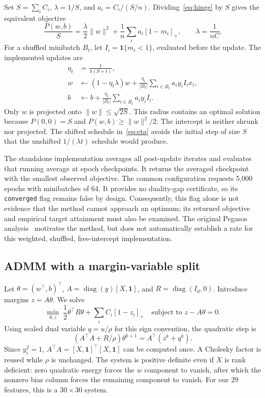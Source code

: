 \documentclass{article}
\newcommand{\hinge}[1]{\left[#1\right]_{+}}
\newcommand{\ind}{\mathbf{1}}
\begin{document}
Set $S=\sum_iC_i$, $\lambda=1/S$, and $a_i=C_i/(S/n)$. Dividing~\eqref{eq:hinge} by $S$ gives the equivalent objective
\begin{equation}
 \frac{P(w,b)}{S}=\frac{\lambda}{2}\lVert w\rVert^2+
 \frac1n\sum_i a_i\hinge{1-m_i},\qquad \lambda=\frac1{nC}.
 \label{eq:pegasos-form}
\end{equation}
For a shuffled minibatch $B_t$, let $I_i=\ind\{m_i<1\}$, evaluated before the update. The implemented updates are
\begin{align}
 \eta_t&=\frac{1}{\lambda(S+t)},\label{eq:eta}\\
 w&\leftarrow(1-\eta_t\lambda)w+
       \frac{\eta_t}{|B_t|}\sum_{i\in B_t} a_i y_i I_i x_i,\\
 b&\leftarrow b+\frac{\eta_t}{|B_t|}\sum_{i\in B_t}a_i y_i I_i.
\end{align}
Only $w$ is projected onto $\lVert w\rVert\leq\sqrt{2S}$. This radius contains an optimal solution because $P(0,0)=S$ and $P(w,b)\geq\lVert w\rVert^2/2$. The intercept is neither shrunk nor projected. The shifted schedule in~\eqref{eq:eta} avoids the initial step of size $S$ that the unshifted $1/(\lambda t)$ schedule would produce.

The standalone implementation averages all post-update iterates and evaluates that running average at epoch checkpoints. It returns the averaged checkpoint with the smallest observed objective. The common configuration requests 5,000 epochs with minibatches of 64. It provides no duality-gap certificate, so its \texttt{converged} flag remains false by design. Consequently, this flag alone is not evidence that the method cannot approach an optimum; its returned objective and empirical target attainment must also be examined. The original Pegasos analysis~\citep{shalev2011} motivates the method, but does not automatically establish a rate for this weighted, shuffled, free-intercept implementation.

\subsection{ADMM with a margin-variable split}

Let $\theta=(w^\top,b)^\top$, $A=\operatorname{diag}(y)[X,\mathbf1]$, and $R=\operatorname{diag}(I_d,0)$. Introduce margins $z=A\theta$. We solve
\begin{equation}
 \min_{\theta,z}\;\frac12\theta^\top R\theta+\sum_iC_i\hinge{1-z_i}
 \quad\text{subject to }z-A\theta=0.
\end{equation}
Using scaled dual variable $q=u/\rho$ for this sign convention, the quadratic step is
\begin{equation}
 (A^\top A+R/\rho)\theta^{k+1}=A^\top(z^k+q^k).
 \label{eq:theta}
\end{equation}
Since $y_i^2=1$, $A^\top A=[X,\mathbf1]^\top[X,\mathbf1]$ can be computed once. A Cholesky factor is reused while $\rho$ is unchanged. The system is positive definite even if $X$ is rank deficient: zero quadratic energy forces the $w$ component to vanish, after which the nonzero bias column forces the remaining component to vanish. For our 29 features, this is a $30\times30$ system.
\end{document}
